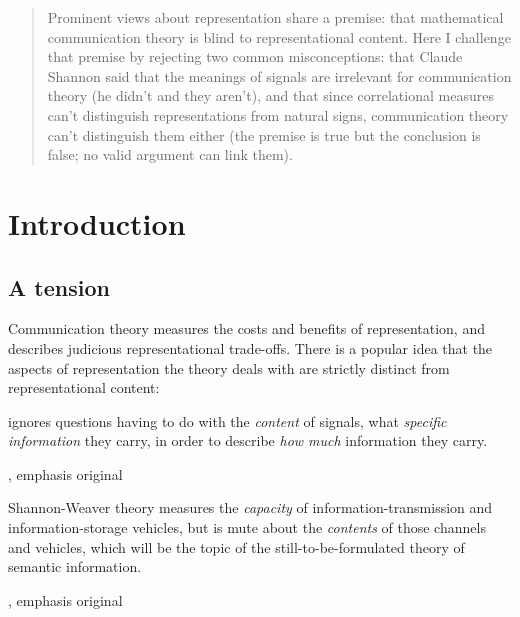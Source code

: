 \documentclass[12pt]{article}
\begin{document}
\maketitle


\begin{abstract}
\noindent Prominent views about representation share a premise: that mathematical communication theory is blind to representational content. Here I challenge that premise by rejecting two common misconceptions: that Claude Shannon said that the meanings of signals are irrelevant for communication theory (he didn't and they aren't), and that since correlational measures can't distinguish representations from natural signs, communication theory can't distinguish them either (the premise is true but the conclusion is false; no valid argument can link them).
\end{abstract}

\section{Introduction}\label{sec:intro}

\subsection{A tension}

Communication theory measures the costs and benefits of representation, and describes judicious representational trade-offs. 
There is a popular idea that the aspects of representation the theory deals with are strictly distinct from representational content:

\begin{myquote}
 ignores questions having to do with the \emph{content} of signals, what \emph{specific information} they carry, in order to describe \emph{how much} information they carry.
\par\hspace*{\fill}\citet[41]{dretske1981knowledge}, emphasis original
\end{myquote}

\begin{myquote}
Shannon-Weaver theory measures the \emph{capacity} of information-transmission and information-storage vehicles, but is mute about the \emph{contents} of those channels and vehicles, which will be the topic of the still-to-be-formulated theory of semantic information.
\par\hspace*{\fill}\citet[344]{dennett1983intentional}, emphasis original
\end{myquote}
\end{document}
